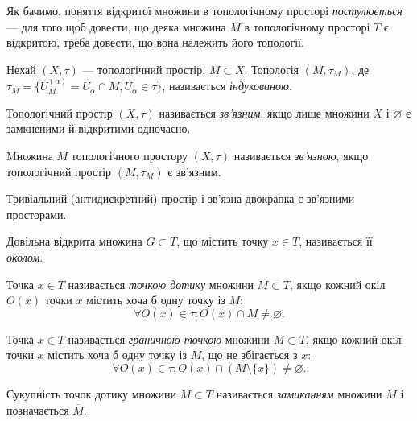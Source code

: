 \documentclass[a4paper, 12pt]{article}
\renewcommand{\emptyset}{\varnothing}
\begin{document}
Як бачимо, поняття відкритої множини в топологічному
просторі \textit{постулюється} --- для того щоб довести, що деяка
множина $M$ в топологічному просторі $T$ є відкритою, треба
довести, що вона належить його топології.

\begin{definition}
	Нехай $(X, \tau)$ --- топологічний простір, $M \subset X$.
	Топологія $(M, \tau_M)$, де $\tau_M = \{ U_M^{(\alpha)} = U_\alpha \cap M, U_\alpha \in \tau\}$,
	називається \textit{індукованою.} 
\end{definition}

\begin{definition}
	Топологічний простір $(X, \tau)$ називається
	\textit{зв'язним}, якщо лише множини $X$ і $\emptyset$ є замкненими й
	відкритими одночасно.
\end{definition}

\begin{definition}
	Mножина $M$ топологічного простору $(X, \tau)$
	називається \textit{зв'язною}, якщо топологічний простір $(M, \tau_M)$
	є зв'язним.
\end{definition}

\begin{example}
	Тривіальний (антидискретний) простір і
	зв'язна двокрапка є зв'язними просторами.
\end{example}

\begin{definition}
	Довільна відкрита множина $G \subset T$, що
	містить точку $x \in T$, називається її \textit{околом}.
\end{definition}

\begin{definition}
	Точка $x \in T$ називається \textit{точкою дотику}
	множини $M \subset T$, якщо кожний окіл $O(x)$ точки $x$ містить
	хоча б одну точку із $M$: \[\forall O(x) \in \tau: O(x) \cap M \ne \emptyset.\]
\end{definition}

\begin{definition}
	Точка $x \in T$ називається \textit{граничною точкою}
	множини $M \subset T$, якщо кожний окіл точки $x$ містить хоча
	б одну точку із $M$, що не збігається з $x$: \[\forall O(x) \in \tau: O(x) \cap (M \setminus \{x\}) \ne \emptyset.\]
\end{definition}

\begin{definition}
	Сукупність точок дотику множини $M \subset T$
	називається \textit{замиканням} множини $M$ і позначається $\overline{M}$.
\end{definition}
\end{document}
